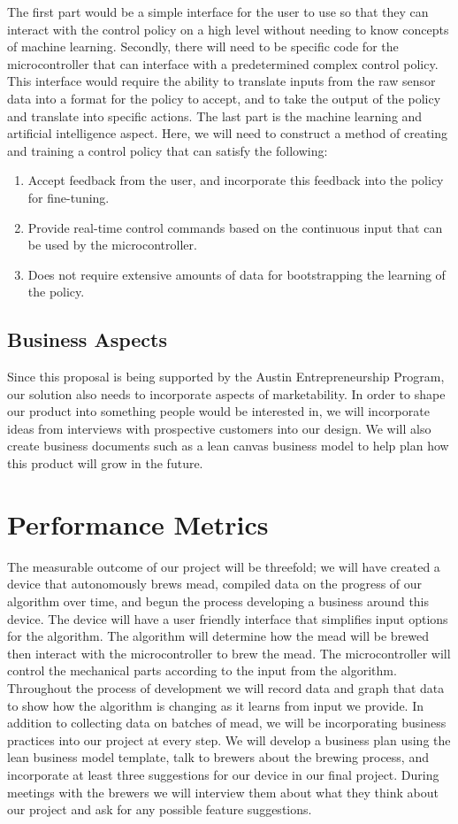 \documentclass[letterpaper,10pt]{article}
\begin{document}
The first part would be a simple interface for the user to use so that they can interact with the control policy on a high level without needing to know concepts of machine learning.
Secondly, there will need to be specific code for the microcontroller that can interface with a predetermined complex control policy.
This interface would require the ability to translate inputs from the raw sensor data into a format for the policy to accept, and to take the  output of the policy and translate into specific actions.
The last part is the machine learning and artificial intelligence aspect.
Here, we will need to construct a method of creating and training a control policy that can satisfy the following:
\begin{enumerate}
	\item Accept feedback from the user, and incorporate this feedback into the policy for fine-tuning.
	\item Provide real-time control commands based on the continuous input that can be used by the microcontroller.
	\item Does not require extensive amounts of data for bootstrapping the learning of the policy.
\end{enumerate}

\subsection{Business Aspects}
Since this proposal is being supported by the Austin Entrepreneurship Program, our solution also needs to incorporate aspects of marketability.
In order to shape our product into something people would be interested in, we will incorporate ideas from interviews with prospective customers into our design.
We will also create business documents such as a lean canvas business model to help plan how this product will grow in the future.

\section{Performance Metrics}
The measurable outcome of our project will be threefold; we will have created
a device that autonomously brews mead, compiled data on the progress of our 
algorithm over time, and begun the process developing a business around this
device. The device will have a user friendly interface that simplifies input
options for the algorithm. The algorithm will determine how the mead will be
brewed then interact with the microcontroller to brew the mead. The 
microcontroller will control the mechanical parts according to the input from
the algorithm. Throughout the process of development we will record data and
graph that data to show how the algorithm is changing as it learns from input
we provide. In addition to collecting data on batches of mead, we will be 
incorporating business practices into our project at every step. We will 
develop a business plan using the lean business model template, talk to 
brewers about the brewing process, and incorporate at least three suggestions
for our device in our final project. During meetings with the brewers we will
interview them about what they think about our project and ask for any 
possible feature suggestions.
\end{document}

